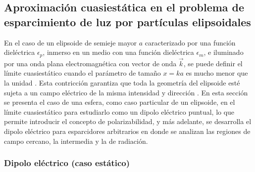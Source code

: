 \hypertarget{primera}{\subsection{Aproximación cuasiestática en el problema de esparcimiento de luz por partículas elipsoidales}}

 En el caso de un elipsoide de semieje mayor $a$ caracterizado por una función dieléctrica $\epsilon_p$, inmerso en un medio con una función dieléctrica $\epsilon_m$, e iluminado por una onda plana electromagnética con vector de onda $\Vec{k}$, se puede definir el límite cuasiestático cuando el parámetro de tamaño $x=ka$ es mucho menor que la unidad \cite{Bohren}. Esta contricción garantiza que toda la geometría del elipsoide esté sujeta a un campo eléctrico de la misma intensidad y dirección \cite{Miguel}. En esta sección se presenta el caso de una esfera, como caso particular de un elipsoide, en el límite cuasiestático para estudiarlo como un dipolo eléctrico puntual, lo que permite introducir el concepto de polarizabilidad, y más adelante, se desarrolla el dipolo eléctrico para esparcidores arbitrarios en donde se analizan las regiones de campo cercano, la intermedia y la de radiación.


\subsubsection{Dipolo eléctrico (caso estático)}

